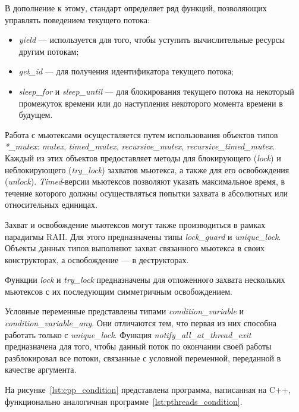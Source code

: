 В дополнение к этому, стандарт определяет ряд функций, позволяющих управлять
поведением текущего потока:
\begin{itemize}
\item \textit{yield} --- используется для того, чтобы уступить вычислительные
  ресурсы другим потокам;
\item \textit{get\_id} --- для получения идентификатора текущего потока;
\item \textit{sleep\_for} и \textit{sleep\_until} --- для блокирования
  текущего потока на некоторый промежуток времени или до наступления
  некоторого момента времени в будущем.
\end{itemize}

Работа с мьютексами осуществляется путем использования объектов
типов \textit{*\_mutex}:
\textit{mutex}, \textit{timed\_mutex},
\textit{recursive\_mutex}, \textit{recursive\_timed\_mutex}.
Каждый из этих объектов предоставляет методы для
блокирующего (\textit{lock}) и неблокирующего (\textit{try\_lock})
захватов мьютекса, а также для его освобождения (\textit{unlock}).
\textit{Timed}-версии мьютексов позволяют указать максимальное время,
в течение которого должны осуществляться попытки захвата в абсолютных
или относительных единицах.

Захват и освобождение мьютексов могут также производиться в рамках
парадигмы RAII. Для этого предназначены типы \textit{lock\_guard} и
\textit{unique\_lock}. Объекты данных типов выполняют захват связанного
мьютекса в своих конструкторах, а освобождение --- в деструкторах.

Функции \textit{lock} и \textit{try\_lock} предназначены для
отложенного захвата нескольких мьютексов с их последующим
симметричным освобождением.

Условные переменные представлены типами \textit{condition\_variable}
и \textit{condition\_variable\_any}.
Они отличаются тем, что первая из них способна работать
только с \textit{unique\_lock}.
Функция \textit{notify\_all\_at\_thread\_exit} предназначена для
того, чтобы данный поток по окончании своей работы
разблокировал все потоки, связанные с условной переменной,
переданной в качестве аргумента.

На рисунке~\ref{lst:cpp_condition} представлена программа,
написанная на C++, функционально аналогичная
программе~\ref{lst:pthreads_condition}.



